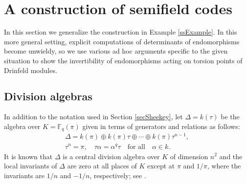 \documentclass[12pt]{amsart}
\theoremstyle{definition}
\theoremstyle{remark}
\numberwithin{equation}{section}
\numberwithin{thm}{section}
\DeclareMathOperator{\End}{End}
\newcommand{\fp}{\mathfrak{p}}
\newcommand{\F}{\mathbb{F}}
\begin{document}

\section{A construction of semifield codes}\label{s2C}

In this section we generalize the construction in Example \ref{ssExample}. In this more general setting, explicit computations 
of determinants of endomorphisms become unwieldy, so we use various ad hoc arguments specific to the given situation to show the invertibility 
of endomorphisms acting on torsion points of Drinfeld modules.  

\subsection{Division algebras} 

In addition to the notation used in Section \ref{secSheekey}, let $\Delta=k(\tau)$ be the algebra over $K=\F_q(\pi)$ given in terms 
of generators and relations as follows:
\begin{align*}
	\Delta=k(\pi)\oplus k(\pi)\tau\oplus \cdots\oplus k(\pi)\tau^{n-1}, \\ 
	\tau^n=\pi, \quad \tau\alpha=\alpha^q\tau \quad \text{for all}\quad \alpha\in k. 
\end{align*} 
It is known that $\Delta$ is a central division algebra over $K$ of dimension $n^2$ and the local invariants of $\Delta$ are
zero at all places of $K$ except at $\pi$ and $1/\pi$, where the invariants are $1/n$ and $-1/n$, respectively; see \cite[Section 4.1]{PapikianGTM}. 
\end{document}

